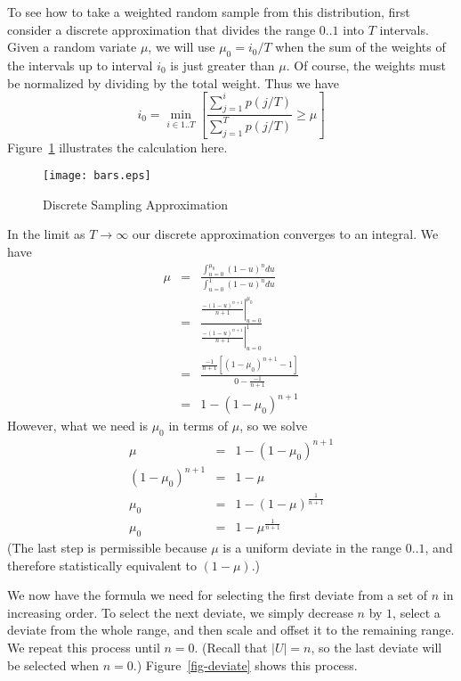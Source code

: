 \documentclass[12pt]{article}
\begin{document}
  To see how to take a weighted random sample from this
  distribution, first consider a discrete approximation that
  divides the range $0..1$ into $T$ intervals.  Given a
  random variate $\mu$, we will use $\mu_0=i_0/T$ when
  the sum of the weights of the intervals up to interval $i_0$
  is just greater than $\mu$.  Of course, the weights must be
  normalized by dividing by the total weight.  Thus we have
    $$i_0=\min_{i\in1..T}\left[{\frac{\sum_{j=1}^{i}{p(j/T)}}
                         {\sum_{j=1}^{T}{p(j/T)}} \ge \mu}\right]$$
  Figure~\ref{fig-calculus} illustrates the calculation
  here.

  \begin{figure}
    \centering
    \texttt{[image: bars.eps]}
    \caption{Discrete Sampling Approximation}\label{fig-calculus}
  \end{figure}

  In the limit as $T\rightarrow\infty$ our discrete
  approximation converges to an integral.  We have
    \begin{eqnarray*}
      \mu &=& \frac{\int_{u=0}^{\mu_0}{(1-u)^n \textit{du}}}
                   {\int_{u=0}^{1}{(1-u)^n \textit{du}}} \\
	  &=& \frac{\left.\frac{-(1-u)^{n+1}}{n+1}\right|_{u=0}^{\mu_0}}
		   {\left.\frac{-(1-u)^{n+1}}{n+1}\right|_{u=0}^{1}} \\
          &=& \frac{\frac{-1}{n+1}\left[(1-\mu_0)^{n+1}-1\right]}
		   {0-\frac{-1}{n+1}} \\
          &=& 1 - (1 - \mu_0)^{n+1}
    \end{eqnarray*}
  However, what we need is $\mu_0$ in terms of
  $\mu$, so we solve
    \begin{eqnarray*}
       \mu &=& 1 - (1 - \mu_0)^{n+1} \\
       (1 - \mu_0)^{n+1} &=& 1 - \mu \\
       \mu_0 &=& 1 - (1 - \mu)^\frac{1}{n+1} \\
       \mu_0 &=& 1 - \mu^\frac{1}{n+1}
    \end{eqnarray*}
  (The last step is permissible because $\mu$ is a
  uniform deviate in the range $0..1$, and therefore
  statistically equivalent to $(1-\mu)$.)

  We now have the formula we need for selecting the first
  deviate from a set of $n$ in increasing order.  To select
  the next deviate, we simply decrease $n$ by $1$, select a
  deviate from the whole range, and then scale and offset it
  to the remaining range.  We repeat this process until
  $n=0$.  (Recall that $|U|=n$, so the last deviate will be
  selected when $n=0$.)  Figure~\ref{fig-deviate} shows
  this process.
  
\end{document}
